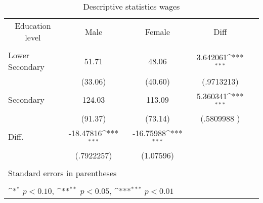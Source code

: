 \begin{table}[htbp]\centering
    \def\sym#1{\ifmmode^{#1}\else\(^{#1}\)\fi}
    \caption{\label{desc-table1a}Descriptive statistics wages}
    \begin{tabular}{l*{4}{c}}
        \hline

        \multicolumn{1}{c}{Education level}   &\multicolumn{1}{c}{Male}&\multicolumn{1}{c}{Female}&\multicolumn{1}{c}{Diff}\\
                        \\
        \hline
        Lower Secondary &       51.71           &    48.06          &   3.642061\sym{***} \\
                        &       (33.06)         &   (40.60)         &  (.9713213)       \\
        Secondary       &       124.03          &    113.09         &   5.360341\sym{***}   \\
                        &       (91.37)         &   (73.14)         &   (.5809988 )       \\
        Diff.           &       -18.47816\sym{***} &   -16.75988\sym{***} &                      \\
                        &       (.7922257)  &   (1.07596)           &                       \\
        \\
        \hline
        \multicolumn{3}{l}{\footnotesize Standard errors in parentheses}\\
        \multicolumn{3}{l}{\footnotesize }\\
        \multicolumn{3}{l}{\footnotesize \sym{*} \(p<0.10\), \sym{**} \(p<0.05\), \sym{***} \(p<0.01\)}\\

    \end{tabular}
\end{table}
